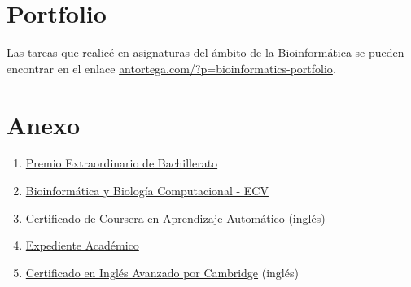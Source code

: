 \documentclass[paper=a4,fontsize=11pt]{article} %
\newcommand{\NewPart}[1]{\section*{
									{#1}}}
\begin{document}
\NewPart{Portfolio}

Las tareas que realicé en asignaturas del ámbito de la Bioinformática se pueden encontrar en el enlace \href{antortega.com/?p=bioinformatics-portfolio}{antortega.com/?p=bioinformatics-portfolio}.



\NewPart{Anexo}
\begin{enumerate}


\item \hyperlink{premio_extraordinario}{Premio Extraordinario de Bachillerato}
\item \hyperlink{complu}{Bioinformática y Biología Computacional - ECV}

\item \hyperlink{ML-Coursera}{Certificado de Coursera en Aprendizaje Automático (inglés)}

\item \hyperlink{exp-en}{Expediente Académico}
\item \hyperlink{cae}{Certificado en Inglés Avanzado por Cambridge} (inglés)
\end{enumerate}
%



\end{document}

